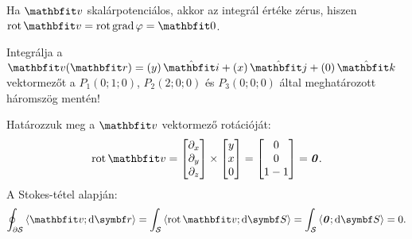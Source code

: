 \documentclass{szb-practice}
\begin{document}
\begin{note}
  Ha $\rvec v$ skalárpotenciálos, akkor az integrál értéke zérus, hiszen
  $\rot \rvec v = \rot \grad \varphi = \rvec 0$.
\end{note}

\begin{example}
  Integrálja a $\rvec v(\coordv) = \ijk{y}{x}{0}$ vektormezőt a $P_1(0;1;0)$,
  $P_2(2;0;0)$ és $P_3(0;0;0)$ által meghatározott háromszög mentén!

  Határozzuk meg a $\rvec v$ vektormező rotációját:
  $$
    \rot \rvec v
    =
    \begin{bmatrix}
      \partial_x \\ \partial_y \\ \partial_z
    \end{bmatrix}
    \times
    \begin{bmatrix}
      y \\ x \\ 0
    \end{bmatrix}
    =
    \begin{bmatrix}
      0 \\ 0 \\ 1 - 1
    \end{bmatrix}
    =
    \nvec
    \text.
  $$
  A Stokes-tétel alapján:
  $$
    \oint_{\partial \surfimage} \scalar{\rvec v}{\dd \curvevec}
    = \int_{\surfimage} \scalar{\rot \rvec v}{\dd \surfvec}
    = \int_{\surfimage} \scalar{\nvec}{\dd \surfvec}
    = 0
    \text.
  $$
\end{example}
\end{document}
